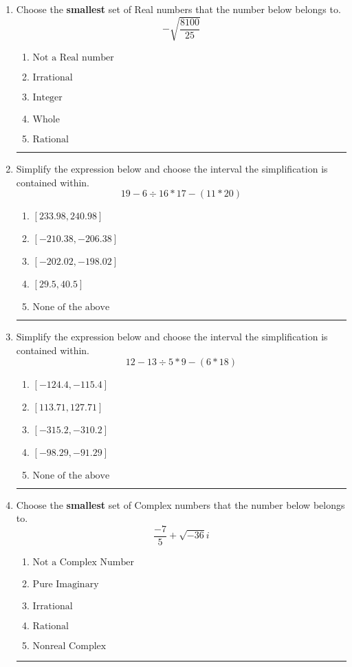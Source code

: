 \documentclass[14pt]{extbook}
\newcommand{\litem}[1]{\item#1\hspace*{-1cm}\rule{\textwidth}{0.4pt}}
\begin{document}
\begin{enumerate}
\litem{
Choose the \textbf{smallest} set of Real numbers that the number below belongs to.\[ -\sqrt{\frac{8100}{25}} \]\begin{enumerate}[label=\Alph*.]
\item \( \text{Not a Real number} \)
\item \( \text{Irrational} \)
\item \( \text{Integer} \)
\item \( \text{Whole} \)
\item \( \text{Rational} \)

\end{enumerate} }
\litem{
Simplify the expression below and choose the interval the simplification is contained within.\[ 19 - 6 \div 16 * 17 - (11 * 20) \]\begin{enumerate}[label=\Alph*.]
\item \( [233.98, 240.98] \)
\item \( [-210.38, -206.38] \)
\item \( [-202.02, -198.02] \)
\item \( [29.5, 40.5] \)
\item \( \text{None of the above} \)

\end{enumerate} }
\litem{
Simplify the expression below and choose the interval the simplification is contained within.\[ 12 - 13 \div 5 * 9 - (6 * 18) \]\begin{enumerate}[label=\Alph*.]
\item \( [-124.4, -115.4] \)
\item \( [113.71, 127.71] \)
\item \( [-315.2, -310.2] \)
\item \( [-98.29, -91.29] \)
\item \( \text{None of the above} \)

\end{enumerate} }
\litem{
Choose the \textbf{smallest} set of Complex numbers that the number below belongs to.\[ \frac{-7}{5}+\sqrt{-36}i \]\begin{enumerate}[label=\Alph*.]
\item \( \text{Not a Complex Number} \)
\item \( \text{Pure Imaginary} \)
\item \( \text{Irrational} \)
\item \( \text{Rational} \)
\item \( \text{Nonreal Complex} \)


\end{enumerate}}
\end{enumerate}
\end{document}
